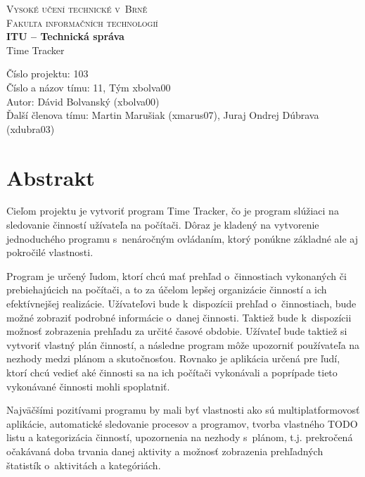 \documentclass[]{article}
\begin{document}
	
	\begin{titlepage}
		\begin{center}
			\textsc{{\LARGE Vysoké učení technické v~Brně\\[0.3em]
					Fakulta informačních technologií}}\\
			{\Huge \textbf{ITU -- Technická správa}\\[0.2em]Time Tracker}
		\end{center}
		
		\noindent Číslo projektu: 103\\
		Číslo a názov tímu: 11, Tým xbolva00\\
		Autor: Dávid Bolvanský (xbolva00)\\
		Ďalší členova tímu: Martin Marušiak (xmarus07), Juraj Ondrej Dúbrava (xdubra03)\\
\end{titlepage}

\tableofcontents

\newpage

\section{Abstrakt}
Cieľom projektu je vytvoriť program Time Tracker, čo je program slúžiaci na sledovanie činností užívateľa na počítači. Dôraz je kladený na vytvorenie jednoduchého programu s~nenáročným ovládaním, ktorý ponúkne základné ale aj pokročilé vlastnosti. 

Program je určený ľudom, ktorí chcú mať prehľad o~činnostiach vykonaných či prebiehajúcich na počítači, a to za účelom lepšej organizácie činností a ich efektívnejšej realizácie. Užívateľovi bude k~dispozícii prehľad o~činnostiach, bude možné zobraziť podrobné informácie o~danej činnosti. Taktiež bude k~dispozícii možnosť zobrazenia prehľadu za určité časové obdobie. Užívateľ bude taktiež si vytvoriť vlastný plán činností, a následne program môže upozorniť používateľa na nezhody medzi plánom a skutočnosťou. Rovnako je aplikácia určená pre ľudí, ktorí chcú vedieť aké činnosti sa na ich počítači vykonávali a poprípade tieto vykonávané činnosti mohli spoplatniť.

Najväčšími pozitívami programu by mali byť vlastnosti ako sú multiplatformovosť aplikácie, automatické sledovanie procesov a programov, tvorba vlastného TODO listu a kategorizácia činností, upozornenia na nezhody s~plánom, t.j. prekročená očakávaná doba trvania danej aktivity a možnosť zobrazenia prehľadných štatistík o~aktivitách a kategóriách.
\end{document}

